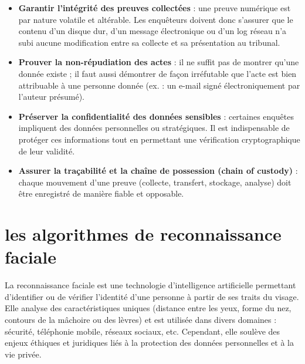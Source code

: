 \documentclass[12pt]{article}
\begin{document}
\begin{center}
\begin{itemize}[leftmargin=*, label=\textbullet]
    \item \textbf{Garantir l’intégrité des preuves collectées} : une preuve numérique est par nature volatile et altérable. Les enquêteurs doivent donc s’assurer que le contenu d’un disque dur, d’un message électronique ou d’un log réseau n’a subi aucune modification entre sa collecte et sa présentation au tribunal.
    
    \item \textbf{Prouver la non-répudiation des actes} : il ne suffit pas de montrer qu’une donnée existe ; il faut aussi démontrer de façon irréfutable que l’acte est bien attribuable à une personne donnée (ex. : un e-mail signé électroniquement par l’auteur présumé).
    
    \item \textbf{Préserver la confidentialité des données sensibles} : certaines enquêtes impliquent des données personnelles ou stratégiques. Il est indispensable de protéger ces informations tout en permettant une vérification cryptographique de leur validité.
    
    \item \textbf{Assurer la traçabilité et la chaîne de possession (chain of custody)} : chaque mouvement d’une preuve (collecte, transfert, stockage, analyse) doit être enregistré de manière fiable et opposable.
\end{itemize}

\section{les algorithmes de reconnaissance
 faciale}
 
La reconnaissance faciale est une technologie d'intelligence artificielle permettant d'identifier ou de vérifier l'identité d'une personne à partir de ses traits du visage. Elle analyse des caractéristiques uniques (distance entre les yeux, forme du nez, contours de la mâchoire ou des lèvres) et est utilisée dans divers domaines : sécurité, téléphonie mobile, réseaux sociaux, etc. Cependant, elle soulève des enjeux éthiques et juridiques liés à la protection des données personnelles et à la vie privée.


\end{center}
\end{document}
